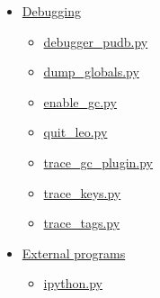 \documentclass[a4paper,10pt,english]{sphinxmanual}
\begin{document}
{\begin{minipage}{0.95\linewidth}
\begin{itemize}
\begin{itemize}
\begin{itemize}
\begin{itemize}
\item {} 
{\hyperref[plugins:nodeactions-py]{nodeActions.py}}

\item {} 
{\hyperref[plugins:outline-export-py]{outline\_export.py}}

\item {} 
{\hyperref[plugins:paste-as-headlines-py]{paste\_as\_headlines.py}}

\item {} 
{\hyperref[plugins:pretty-print-py]{pretty\_print.py}}

\item {} 
{\hyperref[plugins:quickmove-py]{quickMove.py}}

\item {} 
{\hyperref[plugins:sethomedirectory-py]{setHomeDirectory.py}}

\item {} 
{\hyperref[plugins:word-count-py]{word\_count.py}}

\end{itemize}

\item {} 
{\hyperref[plugins:debugging]{Debugging}}
\begin{itemize}
\item {} 
{\hyperref[plugins:debugger-pudb-py]{debugger\_pudb.py}}

\item {} 
{\hyperref[plugins:dump-globals-py]{dump\_globals.py}}

\item {} 
{\hyperref[plugins:enable-gc-py]{enable\_gc.py}}

\item {} 
{\hyperref[plugins:quit-leo-py]{quit\_leo.py}}

\item {} 
{\hyperref[plugins:trace-gc-plugin-py]{trace\_gc\_plugin.py}}

\item {} 
{\hyperref[plugins:trace-keys-py]{trace\_keys.py}}

\item {} 
{\hyperref[plugins:trace-tags-py]{trace\_tags.py}}

\end{itemize}

\item {} 
{\hyperref[plugins:external-programs]{External programs}}
\begin{itemize}
\item {} 
{\hyperref[plugins:ipython-py]{ipython.py}}


\end{itemize}
\end{itemize}
\end{itemize}
\end{itemize}
\end{minipage}}
\end{document}
